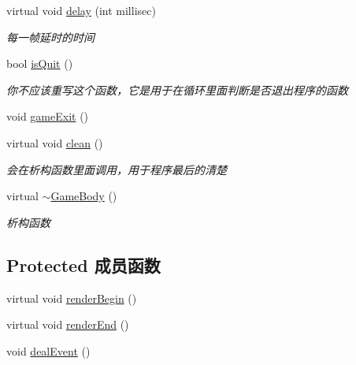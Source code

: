 \begin{DoxyCompactItemize}
virtual void \mbox{\hyperlink{class_game_body_a402e91bd648142d2b4925a6923860852}{delay}} (int millisec)
\begin{DoxyCompactList}\small\item\em 每一帧延时的时间 \end{DoxyCompactList}\item 
bool \mbox{\hyperlink{class_game_body_a9ec4c012ae72dd25d849d6ebacb9357c}{is\+Quit}} ()
\begin{DoxyCompactList}\small\item\em 你不应该重写这个函数，它是用于在循环里面判断是否退出程序的函数 \end{DoxyCompactList}\item 
void \mbox{\hyperlink{class_game_body_a45b3ecd1c3440b75a5316e322a2698e5}{game\+Exit}} ()
\item 
virtual void \mbox{\hyperlink{class_game_body_a804c0e5d53cf79d8b4262ece694be204}{clean}} ()
\begin{DoxyCompactList}\small\item\em 会在析构函数里面调用，用于程序最后的清楚 \end{DoxyCompactList}\item 
virtual \mbox{\hyperlink{class_game_body_af13feb5fae1c033d524dae6210dd58ef}{$\sim$\+Game\+Body}} ()
\begin{DoxyCompactList}\small\item\em 析构函数 \end{DoxyCompactList}\end{DoxyCompactItemize}
\subsection*{Protected 成员函数}
\begin{DoxyCompactItemize}
\item 
virtual void \mbox{\hyperlink{class_game_body_a05ce167838e2b7248090e62d85e9f5b0}{render\+Begin}} ()
\item 
virtual void \mbox{\hyperlink{class_game_body_a630601ce51c48d11096afcfbafa9516f}{render\+End}} ()
\item 
void \mbox{\hyperlink{class_game_body_af1478ab73274e52227253841d16df8bb}{deal\+Event}} ()
\end{DoxyCompactItemize}
